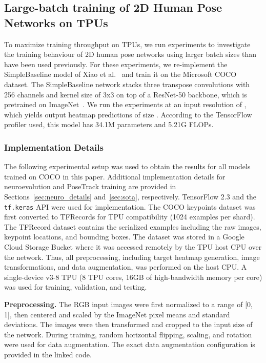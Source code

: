 \documentclass{ieeeaccess}
\begin{document}
\subsection{Large-batch training of 2D Human Pose Networks on TPUs}
\label{sec:large_batch}
To maximize training throughput on TPUs, we run experiments to investigate the training behaviour of 2D human pose networks using larger batch sizes than have been used previously. For these experiments, we re-implement the SimpleBaseline model of Xiao et al.\ \cite{xiao2018simple} and train it on the Microsoft COCO dataset. The SimpleBaseline network stacks three transpose convolutions with 256 channels and kernel size of 3x3 on top of a ResNet-50 backbone, which is pretrained on ImageNet~\cite{krizhevsky2012imagenet}. We run the experiments at an input resolution of , which yields output heatmap predictions of size . According to the TensorFlow profiler used, this model has 34.1M parameters and 5.21G FLOPs.

\subsubsection{Implementation Details}
\label{sec:tpu_details}
The following experimental setup was used to obtain the results for all models trained on COCO in this paper. Additional implementation details for neuroevolution and PoseTrack training are provided in Sections~\ref{sec:neuro_details} and~\ref{sec:sota}, respectively.
TensorFlow 2.3 and the \texttt{tf.keras} API were used for implementation. The COCO keypoints dataset was first converted to TFRecords for TPU compatibility (1024 examples per shard). The TFRecord dataset contains the serialized examples including the raw images, keypoint locations, and bounding boxes. The dataset was stored in a Google Cloud Storage Bucket where it was accessed remotely by the TPU host CPU over the network. Thus, all preprocessing, including target heatmap generation, image transformations, and data augmentation, was performed on the host CPU. A single-device v3-8 TPU (8 TPU cores, 16GB of high-bandwidth memory per core) was used for training, validation, and testing.



\medskip\noindent\textbf{Preprocessing.} The RGB input images were first normalized to a range of [0, 1], then centered and scaled by the ImageNet pixel means and standard deviations. The images were then transformed and cropped to the input size of the network. During training, random horizontal flipping, scaling, and rotation were used for data augmentation. The exact data augmentation configuration is provided in the linked code.
\end{document}
